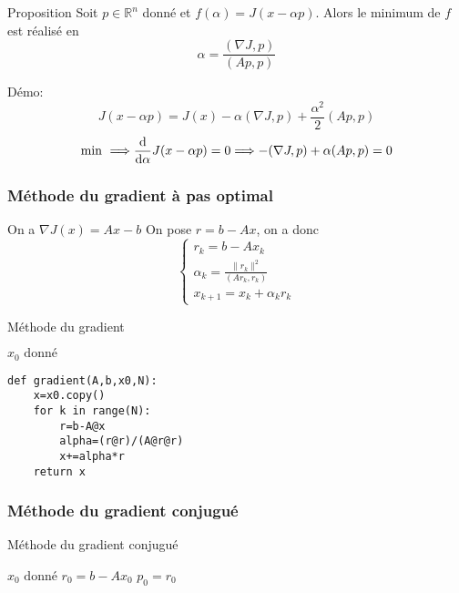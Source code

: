 \documentclass{beamer}
\def \de {{\rm d}}
\newenvironment{algo}{
\begin{algorithm}[H]
\DontPrintSemicolon \SetAlgoVlined}
{\end{algorithm}}
\begin{document}
\begin{frame}

\begin{block}{Proposition}
Soit $p\in \mathbb{R}^n$ donné et $f(\alpha)=J(x-\alpha p)$. Alors le minimum de $f$ est réalisé en
\[\alpha=\frac{(\nabla J,p)}{(Ap,p)}\]
\end{block}
Démo:
\[J(x-\alpha p)=J(x)-\alpha(\nabla J,p)+\frac{\alpha^2}{2}(Ap,p)\]
\[\mbox{min }\Longrightarrow \frac{\de}{\de \alpha}J(x-\alpha p)=0\Longrightarrow -(\nabla J,p)+\alpha (Ap,p)=0\]



\end{frame}


\begin{frame}
\frametitle{Méthode du gradient à pas optimal}
On a $\nabla J(x)=Ax-b$ On pose $r=b-Ax$, on a donc
\[\left\{\begin{array}{l}
r_k=b-Ax_k\\
\alpha_k=\frac{\|r_k\|^2}{(Ar_k,r_k)}\\
x_{k+1}=x_k+\alpha_k r_k
\end{array}\right.
\]

\begin{algo}
\caption{Méthode du gradient }
$x_0 \mbox{ donné}$\;
\end{algo}
\end{frame}

\begin{frame}[fragile]

\begin{verbatim}
def gradient(A,b,x0,N):
    x=x0.copy()
    for k in range(N):
        r=b-A@x
        alpha=(r@r)/(A@r@r)
        x+=alpha*r
    return x

\end{verbatim}
\end{frame}
\begin{frame}
\frametitle{Méthode du gradient conjugué}

\begin{algo}
\caption{Méthode du gradient conjugué}
$x_0 \mbox{ donné}$\;
$r_0 =b-A x_0$\;
$p_0=r_0$\;
\end{algo}
\end{frame}
\end{document}
